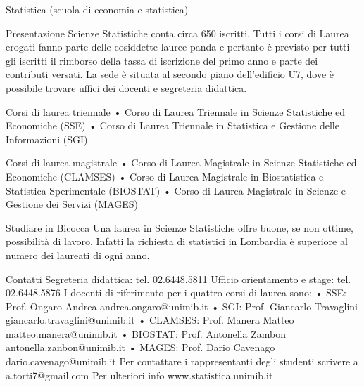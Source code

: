 Statistica (scuola di economia e statistica)

Presentazione
Scienze Statistiche conta circa 650 iscritti. Tutti i corsi di Laurea erogati fanno parte delle cosiddette lauree panda e pertanto è previsto per tutti gli iscritti il rimborso della tassa di iscrizione del primo anno e parte dei contributi versati. 
La sede è situata al secondo piano dell'edificio U7, dove è possibile trovare uffici dei docenti e segreteria didattica.

Corsi di laurea triennale 
    • Corso di Laurea Triennale in Scienze Statistiche ed Economiche (SSE) 
    • Corso di Laurea Triennale in Statistica e Gestione delle Informazioni (SGI) 

Corsi di laurea magistrale
    • Corso di Laurea Magistrale in Scienze Statistiche ed Economiche (CLAMSES) 
    • Corso di Laurea Magistrale in Biostatistica e Statistica Sperimentale (BIOSTAT) 
    • Corso di Laurea Magistrale in Scienze e Gestione dei Servizi (MAGES)

Studiare in Bicocca
Una laurea in Scienze Statistiche offre buone, se non ottime, possibilità di lavoro. Infatti la richiesta di statistici in Lombardia è superiore al numero dei laureati di ogni anno. 

Contatti
Segreteria didattica: tel. 02.6448.5811 
Ufficio orientamento e stage: tel. 02.6448.5876
I docenti di riferimento per i quattro corsi di laurea sono: 
       • SSE: Prof. Ongaro Andrea andrea.ongaro@unimib.it 
       • SGI: Prof. Giancarlo Travaglini giancarlo.travaglini@unimib.it 
       • CLAMSES: Prof. Manera Matteo matteo.manera@unimib.it 
       • BIOSTAT: Prof. Antonella Zambon antonella.zanbon@unimib.it 
       • MAGES: Prof. Dario Cavenago dario.cavenago@unimib.it
Per contattare i rappresentanti degli studenti scrivere a a.torti7@gmail.com  
Per ulteriori info www.statistica.unimib.it 
